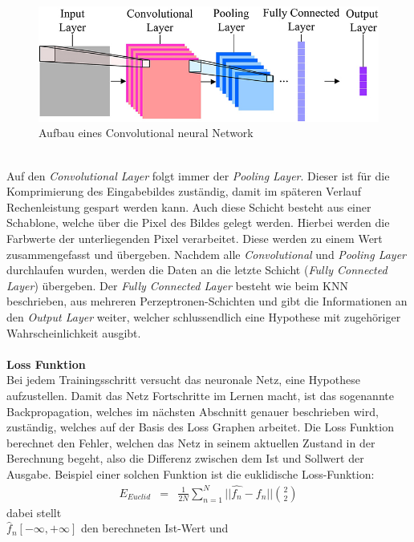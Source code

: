 \begin{figure}
	[h]
	\centering
	\includegraphics[scale=0.5]{Sources/cnnet.jpg}
	\caption{Aufbau eines Convolutional neural Network \cite{info7040061}}
	\label{img:cnn}
\end{figure}\\
Auf den \textit{Convolutional Layer} folgt immer der \textit{Pooling Layer}. Dieser ist für die Komprimierung des Eingabebildes zuständig, damit im späteren Verlauf Rechenleistung gespart werden kann. Auch diese Schicht besteht aus einer Schablone, welche über die Pixel des Bildes gelegt werden. Hierbei werden die Farbwerte der unterliegenden Pixel verarbeitet. Diese werden zu einem Wert zusammengefasst und übergeben. Nachdem alle \textit{Convolutional} und \textit{Pooling Layer} durchlaufen wurden, werden die Daten an die letzte Schicht (\textit{Fully Connected Layer}) übergeben. Der \textit{Fully Connected Layer} besteht wie beim KNN beschrieben, aus mehreren Perzeptronen-Schichten und gibt die Informationen an den \textit{Output Layer} weiter, welcher schlussendlich eine Hypothese mit zugehöriger Wahrscheinlichkeit ausgibt.\\\\
\textbf{Loss Funktion}\\
Bei jedem Trainingsschritt versucht das neuronale Netz, eine Hypothese aufzustellen. Damit das Netz Fortschritte im Lernen macht, ist das sogenannte Backpropagation, welches im nächsten Abschnitt genauer beschrieben wird, zuständig, welches auf der Basis des Loss Graphen arbeitet. Die Loss Funktion berechnet den Fehler, welchen das Netz in seinem aktuellen Zustand in der Berechnung begeht, also die Differenz zwischen dem Ist und Sollwert der Ausgabe. Beispiel einer solchen Funktion ist die euklidische Loss-Funktion:
\begin{eqnarray} E_{Euclid}&=&\frac{1}{2N} \sum_{n=1}^N || \hat{f_{n}}-f_{n} || \binom{2}{2} \end{eqnarray}
dabei stellt\\

	$\hat{f}_{n}[-\infty,+\infty]$ den berechneten Ist-Wert und
	
